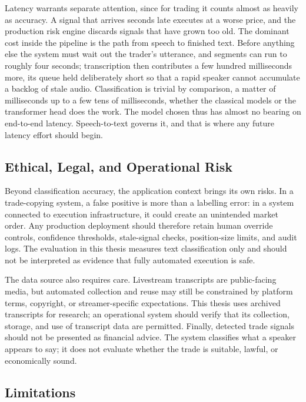 Latency warrants separate attention, since for trading it counts almost as heavily as accuracy. A signal that arrives seconds late executes at a worse price, and the production risk engine discards signals that have grown too old. The dominant cost inside the pipeline is the path from speech to finished text. Before anything else the system must wait out the trader's utterance, and segments can run to roughly four seconds; transcription then contributes a few hundred milliseconds more, its queue held deliberately short so that a rapid speaker cannot accumulate a backlog of stale audio. Classification is trivial by comparison, a matter of milliseconds up to a few tens of milliseconds, whether the classical models or the transformer head does the work. The model chosen thus has almost no bearing on end-to-end latency. Speech-to-text governs it, and that is where any future latency effort should begin.

\subsection{Ethical, Legal, and Operational Risk}
\label{sec:ethics_risk}

Beyond classification accuracy, the application context brings its own risks. In a trade-copying system, a false positive is more than a labelling error: in a system connected to execution infrastructure, it could create an unintended market order. Any production deployment should therefore retain human override controls, confidence thresholds, stale-signal checks, position-size limits, and audit logs. The evaluation in this thesis measures text classification only and should not be interpreted as evidence that fully automated execution is safe.

The data source also requires care. Livestream transcripts are public-facing media, but automated collection and reuse may still be constrained by platform terms, copyright, or streamer-specific expectations. This thesis uses archived transcripts for research; an operational system should verify that its collection, storage, and use of transcript data are permitted. Finally, detected trade signals should not be presented as financial advice. The system classifies what a speaker appears to say; it does not evaluate whether the trade is suitable, lawful, or economically sound.

\subsection{Limitations}
\label{sec:limitations}

